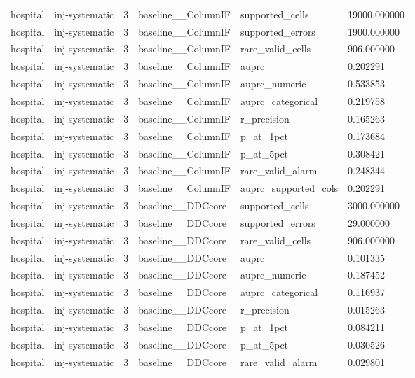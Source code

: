 \begin{tabular}{llllll}
hospital & inj-systematic & 3 & baseline\_\_ColumnIF & supported\_cells & 19000.000000 \\
hospital & inj-systematic & 3 & baseline\_\_ColumnIF & supported\_errors & 1900.000000 \\
hospital & inj-systematic & 3 & baseline\_\_ColumnIF & rare\_valid\_cells & 906.000000 \\
hospital & inj-systematic & 3 & baseline\_\_ColumnIF & auprc & 0.202291 \\
hospital & inj-systematic & 3 & baseline\_\_ColumnIF & auprc\_numeric & 0.533853 \\
hospital & inj-systematic & 3 & baseline\_\_ColumnIF & auprc\_categorical & 0.219758 \\
hospital & inj-systematic & 3 & baseline\_\_ColumnIF & r\_precision & 0.165263 \\
hospital & inj-systematic & 3 & baseline\_\_ColumnIF & p\_at\_1pct & 0.173684 \\
hospital & inj-systematic & 3 & baseline\_\_ColumnIF & p\_at\_5pct & 0.308421 \\
hospital & inj-systematic & 3 & baseline\_\_ColumnIF & rare\_valid\_alarm & 0.248344 \\
hospital & inj-systematic & 3 & baseline\_\_ColumnIF & auprc\_supported\_cols & 0.202291 \\
hospital & inj-systematic & 3 & baseline\_\_DDCcore & supported\_cells & 3000.000000 \\
hospital & inj-systematic & 3 & baseline\_\_DDCcore & supported\_errors & 29.000000 \\
hospital & inj-systematic & 3 & baseline\_\_DDCcore & rare\_valid\_cells & 906.000000 \\
hospital & inj-systematic & 3 & baseline\_\_DDCcore & auprc & 0.101335 \\
hospital & inj-systematic & 3 & baseline\_\_DDCcore & auprc\_numeric & 0.187452 \\
hospital & inj-systematic & 3 & baseline\_\_DDCcore & auprc\_categorical & 0.116937 \\
hospital & inj-systematic & 3 & baseline\_\_DDCcore & r\_precision & 0.015263 \\
hospital & inj-systematic & 3 & baseline\_\_DDCcore & p\_at\_1pct & 0.084211 \\
hospital & inj-systematic & 3 & baseline\_\_DDCcore & p\_at\_5pct & 0.030526 \\
hospital & inj-systematic & 3 & baseline\_\_DDCcore & rare\_valid\_alarm & 0.029801 \\

\end{tabular}
